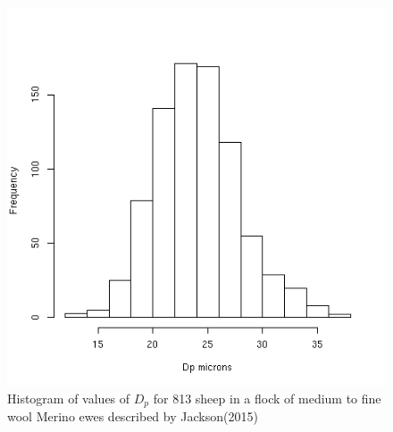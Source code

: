 %

\begin{figure}[!h]
  \centering
   \includegraphics[width=1.0\textwidth]{Dphist.png}
  \caption{Histogram of values of  $D_{p}$ for 813 sheep in a flock of medium to fine wool Merino ewes described by Jackson(2015)~\cite{jack:15}}
  \label{fig:Dphist}
\end{figure}

%

